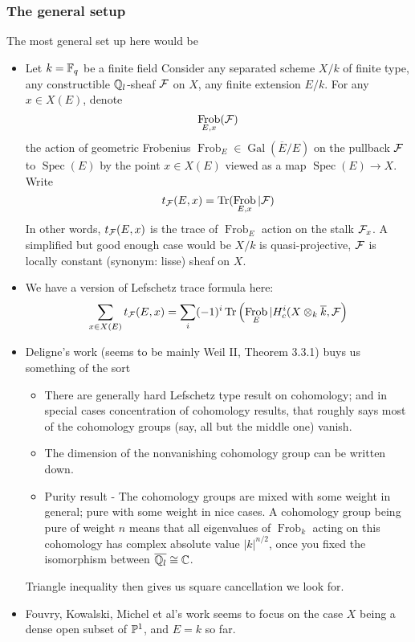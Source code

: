 \documentclass[letterpaper,11pt]{article}
\DeclareMathOperator{\Spec}{Spec}
\DeclareMathOperator{\Frob}{Frob}
\DeclareMathOperator{\Tr}{Tr}
\DeclareMathOperator{\Gal}{Gal}
\begin{document}
\subsubsection{The general setup}
The most general set up here would be 
\begin{itemize}
    \item Let $k = \mathbb{F}_q$ be a finite field Consider any separated scheme $X/k$ of finite type, any constructible $\mathbb{Q}_l$-sheaf $\mathcal{F}$ on $X$, any finite extension $E/k$. For any $x \in X(E)$, denote 
    \[
    \Frob_{E,x} (\cF)
    \]
    the action of geometric Frobenius $\Frob_E \in \Gal(\overline{E}/E)$ on the pullback $\mathcal{F}$ to $\Spec(E)$ by the point $x \in X(E)$ viewed as a map $\Spec (E) \to X$. Write
    \[
    t_{\cF}(E,x) = \Tr(\Frob_{E,x}|\cF)
    \]
    In other words, $t_{\mathcal{F}}(E,x)$ is the trace of $\Frob_E$ action on the stalk $\mathcal{F}_x$.
    A simplified but good enough case would be $X/k$ is quasi-projective, $\mathcal{F}$ is locally constant (synonym: lisse) sheaf on $X$.
    \item We have a version of Lefschetz trace formula here:
    \[
    \sum_{x \in X(E)} t_{\cF}(E,x) = \sum_i (-1)^i \Tr\left(\Frob_E | H_c^i(X \otimes_k \overline{k}, \cF\right)
    \]
    \item Deligne's work (seems to be mainly Weil II, Theorem 3.3.1) buys us something of the sort
    \begin{itemize}
        \item There are generally hard Lefschetz type result on cohomology; and in special cases concentration of cohomology results, that roughly says most of the cohomology groups (say, all but the middle one) vanish.
        \item The dimension of the nonvanishing cohomology group can be written down.
        \item Purity result - The cohomology groups are mixed with some weight in general; pure with some weight in nice cases. A cohomology group being pure of weight $n$ means that all eigenvalues of $\Frob_k$ acting on this cohomology has complex absolute value $|k|^{n/2}$, once you fixed the isomorphism between $\overline{\mathbb{Q}_l} \cong \mathbb{C}$. 
    \end{itemize}
    Triangle inequality then gives us square cancellation we look for.
    \item Fouvry, Kowalski, Michel et al's work seems to focus on the case $X$ being a dense open subset of $\mathbb{P}^1$, and $E = k$ so far.
    \end{itemize}
\end{document}
